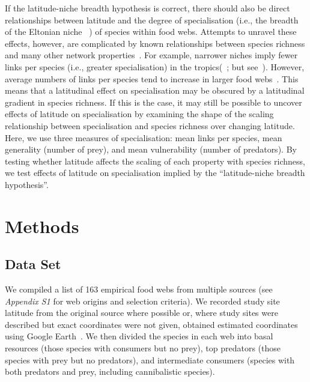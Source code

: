 \documentclass[12pt]{article}
\begin{document}
  If the latitude-niche breadth hypothesis is correct, there should also be direct relationships between latitude and the
  degree of specialisation (i.e., the breadth of the Eltonian niche ~\citep{Elton1927}) of species within food webs.
  Attempts to unravel these effects, however,
  are complicated by known relationships between species richness and many other network properties~\citep{Riede2010}. 
  For example,
  narrower niches imply fewer links per species (i.e., greater specialisation) in the tropics(~\citealp{Marra1997,Dyer2007};
  but see~\citealp{Schleuning2012}). However,
  average numbers of links per species tend to increase in larger food webs~\citep{Dunne2006,Riede2010}. This means
  that a latitudinal effect on specialisation may be obscured by a latitudinal gradient in species richness. If this is
  the case, it may still be possible to uncover effects of latitude on specialisation by examining the shape of the scaling 
  relationship between specialisation and species richness over changing latitude. Here, we use three measures of specialisation:
  mean links per species, mean generality (number of prey), and mean vulnerability (number of predators). By testing whether
  latitude affects the scaling of each property with species richness, we test effects of latitude on specialisation implied by
  the ``latitude-niche breadth hypothesis''.


\section*{Methods}

  \subsection*{Data Set} 

    We compiled a list of 163 empirical food webs from
    multiple sources (see \emph{Appendix S1} for web origins and selection
    criteria). We recorded study site latitude from the original source where
    possible or, where study sites were described but exact coordinates were not
    given, obtained estimated coordinates using Google Earth~\citep{GoogleEarth}.
    We then divided the species in each web into basal resources (those species with
    consumers but no prey), top predators (those species with prey but no predators),
    and intermediate consumers (species with both predators and prey, including cannibalistic
    species). 
\end{document}
